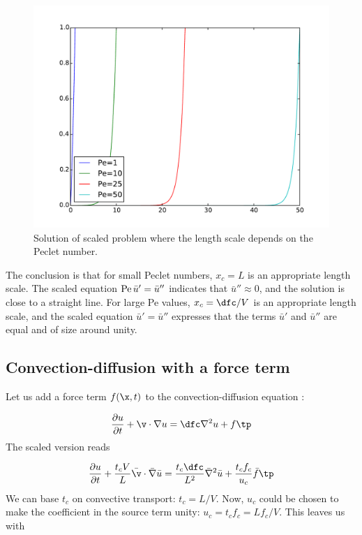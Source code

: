 \documentclass[graybox,envcountchap,sectrefs,final]{svmonodo}
\begin{document}
\begin{figure}[!ht]  %
  \centerline{\includegraphics[width=0.9\linewidth]{fig-scaling/boundary_layer1D_scale2.pdf}}
  \caption{
  Solution of scaled problem where the length scale depends on the Peclet number. \label{scale:convdiff:fig:rescaled}
  }
\end{figure}


The conclusion is that for small Peclet numbers, $x_c=L$ is an
appropriate length scale.
The scaled equation $\hbox{Pe}\,\bar u' = \bar u''$ indicates that $\bar
u''\approx 0$, and the solution is close to a straight line.  For
large Pe values, $x_c=\dfc/V$ is an appropriate length scale, and the
scaled equation $\bar u' = \bar u''$
expresses that the terms $\bar u'$ and $\bar u''$ are
equal and of size around unity.



\subsection{Convection-diffusion with a force term}
\label{scale:convdiff:f}

Let us add a force term $f(\x,t)$ to the convection-diffusion equation :

\begin{equation}
\frac{\partial u}{\partial t} + \v\cdot\nabla u =
\dfc\nabla^2 u + f\tp
\label{scale:convdiff:pde2}
\end{equation}
The scaled version reads

\[
\frac{\partial u}{\partial t} + \frac{t_cV}{L}\bar\v\cdot\bar\nabla \bar u =
\frac{t_c\dfc}{L^2}\bar\nabla^2 \bar u + \frac{t_cf_c}{u_c}\bar f\tp
\]
We can base $t_c$ on convective transport: $t_c = L/V$. Now,
$u_c$ could be chosen to make the coefficient in the source term unity:
$u_c = t_cf_c = Lf_c/V$.
This leaves us with
\end{document}
